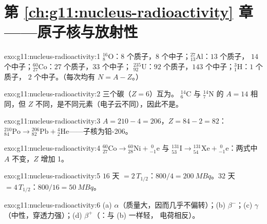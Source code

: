  \section*{第 \ref{ch:g11:nucleus-radioactivity} 章——原子核与放射性}

\begin{solution}{exo:g11:nucleus-radioactivity:1}
${}^{16}_{8}\mathrm{O}$：$8$ 个质子，$8$ 个中子；${}^{27}_{13}\mathrm{Al}$：$13$ 个质子，
$14$ 个中子；${}^{60}_{27}\mathrm{Co}$：$27$ 个质子，$33$ 个中子；
${}^{235}_{92}\mathrm{U}$：$92$ 个质子，$143$ 个中子；${}^{3}_{1}\mathrm{H}$：$1$ 个质子，
$2$ 个中子。（每次均有 $N = A - Z$。）
\end{solution}

\begin{solution}{exo:g11:nucleus-radioactivity:2}
三个碳（$Z = 6$）互为。
${}^{14}_{6}\mathrm{C}$ 与 ${}^{14}_{7}\mathrm{N}$ 的 $A = 14$ 相同，但
$Z$ 不同，是不同元素（电子云不同），因此不是。
\end{solution}

\begin{solution}{exo:g11:nucleus-radioactivity:3}
$A = 210 - 4 = 206$，$Z = 84 - 2 = 82$：
${}^{210}_{84}\mathrm{Po} \to {}^{206}_{82}\mathrm{Pb} +
{}^{4}_{2}\mathrm{He}$——子核为铅-206。
\end{solution}

\begin{solution}{exo:g11:nucleus-radioactivity:4}
${}^{60}_{27}\mathrm{Co} \to {}^{60}_{28}\mathrm{Ni} +
{}^{\;0}_{-1}\mathrm{e}$ 与
${}^{131}_{53}\mathrm{I} \to {}^{131}_{54}\mathrm{Xe} +
{}^{\;0}_{-1}\mathrm{e}$：两式中 $A$ 不变，$Z$ 增加 1。
\end{solution}

\begin{solution}{exo:g11:nucleus-radioactivity:5}
$16$ 天 $= 2\,T_{1/2}$：$800/4 = \qty{200}{MBq}$。$32$ 天
$= 4\,T_{1/2}$：$800/16 = \qty{50}{MBq}$。
\end{solution}

\begin{solution}{exo:g11:nucleus-radioactivity:6}
(a) $\alpha$（质量大，因而几乎不偏转）；(b) $\beta^-$；(c) $\gamma$
（中性，穿透力强）；(d) $\beta^+$（：与 (b) 一样轻，
电荷相反）。
\end{solution}

